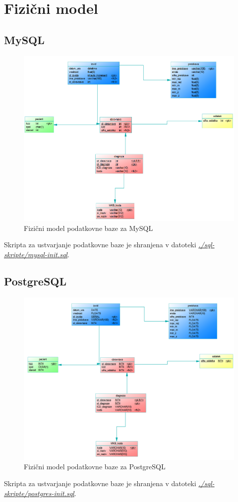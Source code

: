 \documentclass[a4paper,11pt]{report}
\begin{document}
\section{Fizični model}
\subsection{MySQL}
\begin{figure}[htb]
   \noindent\includegraphics[width=\linewidth]{./pics/fizicni-mysql.png}
   \caption{Fizični model podatkovne baze za MySQL}
\end{figure}
Skripta za ustvarjanje podatkovne baze je shranjena v datoteki \textit{\underline{./sql-skripte/mysql-init.sql}}.

\subsection{PostgreSQL}
\begin{figure}[htb]
   \noindent\includegraphics[width=\linewidth]{./pics/fizicni-postgres.png}
   \caption{Fizični model podatkovne baze za PostgreSQL}
\end{figure}
Skripta za ustvarjanje podatkovne baze je shranjena v datoteki \textit{\underline{./sql-skripte/postgres-init.sql}}.
\end{document}
